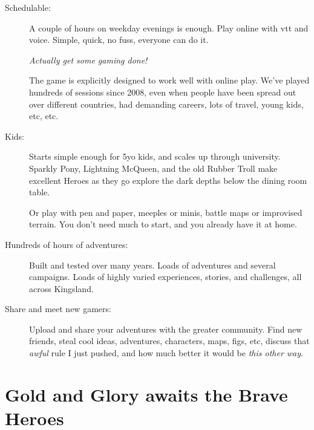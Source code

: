 \begin{description}


\item[Schedulable:] A couple of hours on weekday evenings is enough. Play online with vtt and voice. Simple, quick, no fuss, everyone can do it. 

\emph{Actually get some gaming done!}

The game is explicitly designed to work well with online play. We've played hundreds of sessions since 2008, even when people have been spread out over different countries, had demanding careers, lots of travel, young kids, etc, etc.


\item[Kids:] Starts simple enough for 5yo kids, and scales up through university. Sparkly Pony, Lightning McQueen, and the old Rubber Troll make excellent Heroes as they go explore the dark depths below the dining room table.

Or play with pen and paper, meeples or minis, battle maps or improvised terrain. You don't need much to start, and you already have it at home.


\item[Hundreds of hours of adventures:] Built and tested over many years. Loads of adventures and several campaigns. Loads of highly varied experiences, stories, and challenges, all across Kingsland.


\item[Share and meet new gamers:] Upload and share your adventures with the greater community. Find new friends, steal cool ideas, adventures, characters, maps, figs, etc, discuss that \emph{awful} rule I just pushed, and how much better it would be \emph{this other way}.


%


\end{description}


\clearpage %

\section*{Gold and Glory awaits the Brave Heroes}

